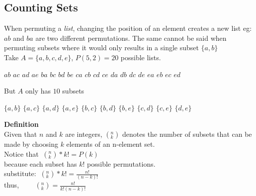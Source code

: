 \documentclass[a4paper,11pt]{article}
\begin{document}
\subsection{Counting Sets}
When permuting a \textit{list}, changing the position of an element creates a new list eg: $ab$ and $ba$ are two different permutations. The same cannot be said when permuting subsets where it would only results in a single subset $\{a, b\}$\vspace{5pt}\\
Take $A=\{a, b, c, d, e\}$, $P(5, 2)=20$ possible lists.
\begin{center}
  $ab$ $ac$ $ad$ $ae$ $ba$ $bc$ $bd$ $be$ $ca$ $cb$ $cd$ $ce$ $da$ $db$ $dc$ $de$ $ea$ $eb$ $ec$ $ed$
\end{center}
But $A$ only has $10$ subsets
\begin{center}
 $\{a,b\}$ $\{a,c\}$ $\{a,d\}$ $\{a,e\}$ $\{b,c\}$ $\{b,d\}$ $\{b,e\}$ $\{c,d\}$ $\{c,e\}$ $\{d,e\}$
\end{center}
\textbf{Definition}\\
Given that $n$ and $k$ are integers, $(^{n}_{k})$ denotes the number of subsets that can be made by choosing $k$ elements of an n-element set.\vspace{5pt}\\
Notice that $~(^{n}_{k})*k!=P(k)$\\because each subset has $k!$ possible permutations.\vspace{2pt}\\
substitute: $~(^{n}_{k})*k!=\frac{n!}{(n-k)!}$\\
thus, $~~~~~~~~~(^{n}_{k})=\frac{n!}{k!(n-k)!}$
\end{document}

